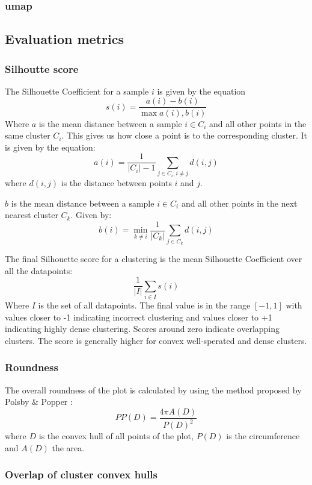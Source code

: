 \documentclass[11pt]{article}
\begin{document}
\subsubsection{umap}
\label{sec:org3da17e9}
\subsection{Evaluation metrics}
\label{sec:org91d2abe}
\subsubsection{Silhoutte score}
\label{sec:org0987a6b}

The Silhouette Coefficient for a sample \(i\) is given by the equation
\[s(i) = \frac{a(i) - b(i)}{\max{a(i), b(i)}} \]
Where \(a\) is the mean distance between a sample \(i \in C_{i}\) and all other points in the same cluster \(C_{i}\). This gives us how close a point is to the corresponding cluster. It is given by the equation:
\[ a(i) = \frac{1}{|C_{i}| - 1} \sum_{j \in C_{i}, i \neq j}{d(i,j)}\]
where \(d(i,j)\) is the distance between points \(i\) and \(j\).

\(b\) is the mean distance between a sample \(i \in C_{i}\) and all other points in the next nearest cluster \(C_{k}\). Given by:
\[ b(i) = \min_{k \neq i}{\frac{1}{|C_{k}|} \sum_{j \in C_{k}}{d(i,j)}} \]

The final Silhouette score for a clustering is the mean Silhouette Coefficient over all the datapoints:
\[ \frac{1}{|I|}\sum_{i \in I}{s(i)} \]
Where \(I\) is the set of all datapoints. The final value is in the range \([-1, 1]\) with values closer to -1 indicating incorrect clustering and values closer to +1 indicating highly dense clustering. Scores around zero indicate overlapping clusters. The score is generally higher for convex well-sperated and dense clusters.

\subsubsection{Roundness}
\label{sec:orgaf848bf}

The overall roundness of the plot is calculated by using the method proposed by Polsby \& Popper \cite{popper}:
\[PP(D) = \frac{4 \pi A(D)}{P(D)^{2}} \]
where \(D\) is the convex hull of all points of the plot, \(P(D)\) is the circumference and \(A(D)\) the area.
\subsubsection{Overlap of cluster convex hulls}
\label{sec:orga46aa6d}
\end{document}
